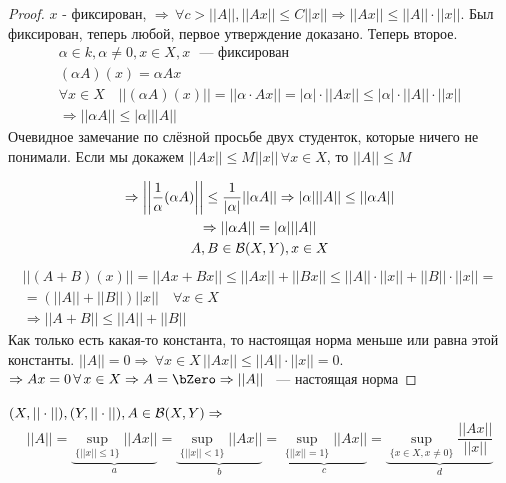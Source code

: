 \documentclass[document]{subfiles}
\begin{document}
\begin{proof}
    $x$ - фиксирован, $\Rightarrow \, \forall c > ||A||, ||Ax|| \leq C ||x|| \Rightarrow ||Ax|| \leq ||A|| \cdot ||x||$. Был фиксирован, теперь любой,
     первое утверждение доказано. Теперь второе. 
     \begin{gather*}
        \alpha \in k, \alpha \ne 0, x \in X, x \text{ ~--- фиксирован } \\
        (\alpha A) (x) = \alpha A x \\
        \forall x \in X \quad ||(\alpha A)(x) || = ||\alpha \cdot Ax|| = |\alpha| \cdot ||A x|| \leq |\alpha| \cdot ||A|| \cdot ||x|| \\
        \Rightarrow ||\alpha A|| \leq |\alpha| ||A||
     \end{gather*}
     Очевидное замечание по слёзной просьбе двух студенток, которые ничего не понимали.
     Если мы докажем $||Ax|| \leq M||x|| \, \forall x \in X$, то $||A|| \leq M$
 
     \begin{gather*}
        \Rightarrow \left|\left| {\frac{1}{\alpha}(\alpha A)} \right| \right| \leq \frac{1}{|\alpha|} ||\alpha A|| \Rightarrow |\alpha| || A|| \leq ||\alpha A|| \\
        \Rightarrow ||\alpha A || = |\alpha| ||A|| \\
        A,B \in \mathcal{B}(X,Y), x \in X 
     \end{gather*}
     \begin{multline*}
        ||(A+B)(x)|| = ||Ax + Bx|| \leq ||Ax|| + ||Bx|| \leq ||A|| \cdot ||x|| + ||B|| \cdot ||x|| = \\
        = (||A|| + ||B||) ||x|| \quad \forall x \in X \\
        \Rightarrow ||A+B|| \leq ||A||+ ||B||
     \end{multline*}
     Как только есть какая-то константа, то настоящая норма меньше или равна этой константы. $||A|| = 0 \Rightarrow \, \forall x \in X \, ||Ax|| \leq ||A|| \cdot ||x|| = 0$.
     $\Rightarrow Ax = 0 \, \forall x \in X \Rightarrow A = \bZero \Rightarrow ||A||$ ~--- настоящая норма
\end{proof}
 
\begin{theorem}
    $(X, ||\cdot||), (Y, ||\cdot||), A \in \mathcal{B}(X,Y) \Rightarrow$ 
    \[ ||A|| = \underbrace{\sup_{\{||x|| \leq 1\}} ||Ax||}_a = \underbrace{\sup_{\{||x|| < 1\}} ||Ax||}_b = \underbrace{\sup_{\{||x|| = 1\}} ||Ax||}_c = \underbrace{\sup_{\{x \in X, x \ne 0\}} \frac{||Ax||}{||x||}}_d \]
\end{theorem}
 
\end{document}

